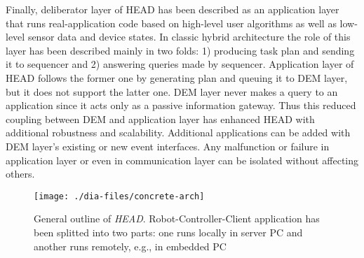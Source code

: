 Finally, deliberator layer of HEAD has been described as an application layer that runs real-application code based on high-level user algorithms as well as low-level sensor data and device states. In classic hybrid architecture the role of this layer has been described mainly in two folds: 1) producing task plan and sending it to sequencer and 2) answering queries made by sequencer. Application layer of HEAD follows the former one by generating plan and queuing it to DEM layer, but it does not support the latter one. DEM layer never makes a query to an application since it acts only as a passive information gateway. Thus this reduced coupling between DEM and application layer has enhanced HEAD with additional robustness and scalability. Additional applications can be added with DEM layer's existing or new event interfaces. Any malfunction or failure in application layer or even in communication layer can be isolated without affecting others. 
\begin{figure*}
\begin{center}
\texttt{[image: ./dia-files/concrete-arch]} %
\caption{General outline of {\em HEAD}. Robot-Controller-Client application has been splitted into two parts: one runs locally in server PC and another runs remotely, e.g., in embedded PC} 
\label{fig:concrete-arch}
\end{center}
\end{figure*}
